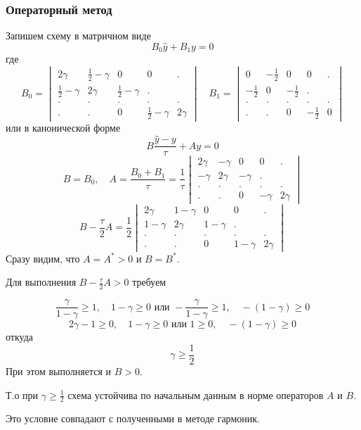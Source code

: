 \documentclass[12pt,a4paper]{article}
\renewcommand{\geq}{\geqslant}
\begin{document}
\subsubsection{Операторный метод}
Запишем схему в матричном виде
$$B_0\hat{y}+B_1 y = 0$$
где $$B_0 = \begin{vmatrix}
2\gamma & \frac{1}{2} - \gamma & 0 & 0&.\\
\frac{1}{2} - \gamma & 2\gamma  & \frac{1}{2} - \gamma & .\\
.&.&.&.&.\\
.&.&0&\frac{1}{2} - \gamma &2\gamma  
\end{vmatrix} \quad B_1 = \begin{vmatrix}
0 & -\frac{1}{2} & 0 & 0&.\\
-\frac{1}{2} & 0 & -\frac{1}{2} & .\\
.&.&.&.&.\\
.&.&0&-\frac{1}{2} & 0
\end{vmatrix}$$
или в канонической форме
$$B\frac{\hat{y}-y}{\tau} + Ay = 0$$
$$B = B_0, \quad A = \frac{B_0+B_1}{\tau} = \frac{1}{\tau}\begin{vmatrix}
2\gamma & - \gamma & 0 & 0&.\\
- \gamma & 2\gamma  & - \gamma & .\\
.&.&.&.&.\\
.&.&0& - \gamma &2\gamma  
\end{vmatrix}$$
$$B-\frac{\tau}{2}A = \frac{1}{2}\begin{vmatrix}
2\gamma & 1 - \gamma & 0 & 0&.\\
1 - \gamma & 2\gamma  & 1 - \gamma & .\\
.&.&.&.&.\\
.&.&0& 1 - \gamma &2\gamma  
\end{vmatrix}$$
Сразу видим, что $A=A^{*}>0$ и $B = B^{*}$.
\begin{flushleft}
 
Для выполнения
  $B -\frac{\tau}{2}A>0$ требуем \end{flushleft}
$$\frac{\gamma}{1 - \gamma}\geq 1 ,\quad 1 - \gamma\geq0 \text{ или }-\frac{\gamma}{1 - \gamma}\geq 1, \quad -(1-\gamma)\geq 0$$
$$2\gamma - 1\geq 0 ,\quad 1 - \gamma\geq0 \text{ или } 1\geq 0, \quad -(1-\gamma)\geq 0$$
откуда
$$\gamma\geq \frac{1}{2}$$
При этом выполняется и $B>0$.

Т.о при $\gamma\geq \frac{1}{2}$ схема устойчива по начальным данным в норме операторов $A$ и $B$. 

Это условие совпадают с полученными в методе гармоник.
\end{document}
